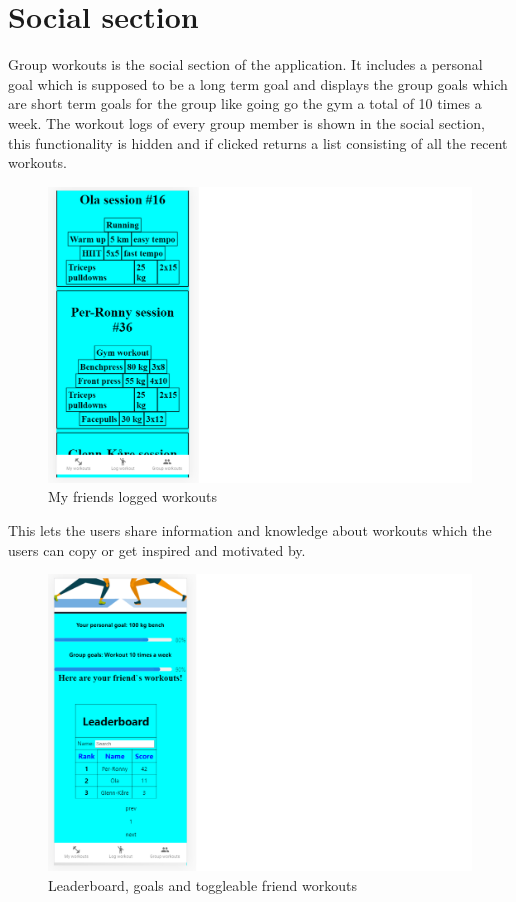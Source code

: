 \section{Social section}
Group workouts is the social section of the application. It includes a personal goal which is supposed to be a long term goal and displays the group goals which are short term goals for the group like going go the gym a total of 10 times a week.
The workout logs of every group member is shown in the social section, this functionality is hidden and if clicked returns a list consisting of all the recent workouts.
\begin{figure}[H]
    \flushright
    \includegraphics[scale=0.6]{figures/friendsworkoutlogs.png}
    \caption{My friends logged workouts}
    \label{FriendLog}
\end{figure}
This lets the users share information and knowledge about workouts which the users can copy or get inspired and motivated by.
\begin{figure}[H]
    \flushright
    \includegraphics[scale=0.6]{figures/leaderboardandgoals.png}
    \caption{Leaderboard, goals and toggleable friend workouts}
    \label{LeaderB}
\end{figure}
